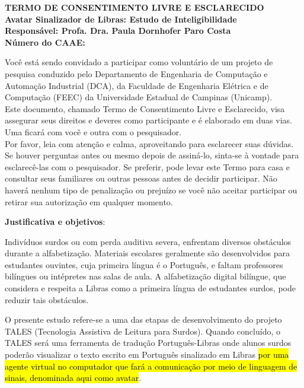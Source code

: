 \documentclass[a4paper, 12pt]{article}
\begin{document}


	\begin{center}
		\textbf{\large{TERMO DE CONSENTIMENTO LIVRE E ESCLARECIDO}}\\
        \vspace{10pt}
        \textbf{\Large{Avatar Sinalizador de Libras: Estudo de Inteligibilidade}}\\
        \vspace{10pt}
        \textbf{Responsável: Profa. Dra. Paula Dornhofer Paro Costa}\\
        \vspace{10pt}
        \textbf{Número do CAAE: }\\
        \vspace{15pt}
	\end{center}

Você está sendo convidado a participar como voluntário de um projeto de pesquisa conduzido pelo Departamento de Engenharia de Computação e Automação Industrial (DCA), da Faculdade de Engenharia Elétrica e de Computação (FEEC) da Universidade Estadual de Campinas (Unicamp).\\

Este documento, chamado Termo de Consentimento Livre e Esclarecido, visa assegurar seus direitos e deveres como participante e é elaborado em duas vias. Uma ficará com você e outra com o pesquisador.\\

Por favor, leia com atenção e calma, aproveitando para esclarecer suas dúvidas. Se houver perguntas antes ou mesmo depois de assiná-lo, sinta-se à vontade para esclarecê-las com o pesquisador. Se preferir, pode levar este Termo para casa e consultar seus familiares ou outras pessoas antes de decidir participar. Não haverá nenhum tipo de penalização ou prejuízo se você não aceitar participar ou retirar sua
autorização em qualquer momento.

\vspace{10pt}
\textbf{Justificativa e objetivos}:

Indivíduos surdos ou com perda auditiva severa, enfrentam diversos obstáculos durante a alfabetização. Materiais escolares geralmente são desenvolvidos para estudantes ouvintes, cuja primeira língua é o Português, e faltam professores bilíngues ou intépretes nas salas de aula. A alfabetização digital bilíngue, que considera e respeita a Libras como a primeira língua de estudantes surdos, pode reduzir tais obstáculos.

O presente estudo refere-se a uma das etapas de desenvolvimento do projeto TALES (Tecnologia Assistiva de Leitura para Surdos). Quando concluído, o TALES será uma ferramenta de tradução Português-Libras onde alunos surdos poderão visualizar o texto escrito em Português sinalizado em Libras \hl{por uma agente virtual no computador que fará a comunicação por meio de linguagem de sinais, denominada aqui como avatar}.
\end{document}
